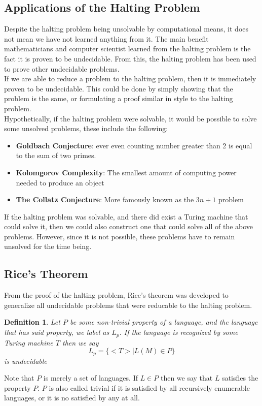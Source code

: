 \documentclass[12pt, letterpaper]{article}
\newtheorem*{defn}{Definition}
\begin{document}
\subsection{Applications of the Halting Problem}
Despite the halting problem being unsolvable by computational means, it does not mean we have not learned anything from it. The main benefit mathematicians and computer scientist learned from the halting problem is the fact it is proven to be undecidable. From this, the halting problem has been used to prove other undecidable problems.\\

If we are able to reduce a problem to the halting problem, then it is immediately proven to be undecidable. This could be done by simply showing that the problem is the same, or formulating a proof similar in style to the halting problem.\cite{wood} \\
Hypothetically, if the halting problem were solvable, it would be possible to solve some unsolved problems, these include the following:
\begin{itemize}
\item \textbf{Goldbach Conjecture}: ever even counting number greater than 2 is equal to the sum of two primes. \cite{gold}
\item \textbf{Kolomgorov Complexity}: The smallest amount of computing power needed to produce an object
\item \textbf{The Collatz Conjecture}: More famously known as the $3n + 1$ problem\cite{simon}
\end{itemize}
If the halting problem was solvable, and there did exist a Turing machine that could solve it, then we could also construct one that could solve all of the above problems. However, since it is not possible, these problems have to remain unsolved for the time being.



\subsection{Rice's Theorem}
From the proof of the halting problem, Rice's theorem was developed to generalize all undecidable problems that were reducable to the halting problem.
\begin{defn}
Let $P$ be some non-trivial property of a language, and the language that has said property, we label as $L_p$. If the language is recognized by some Turing machine $T$ then we say
\[ L_p = \{ <T> | L(M) \in P \} \]
is undecidable
\end{defn}
Note that $P$ is merely a set of languages. If $L \in P$ then we say that $L$ satisfies the property $P$. $P$ is also called trivial if it is satisfied by all recursively enumerable languages, or it is no satisfied by any at all. \cite{bulma}
\end{document}

